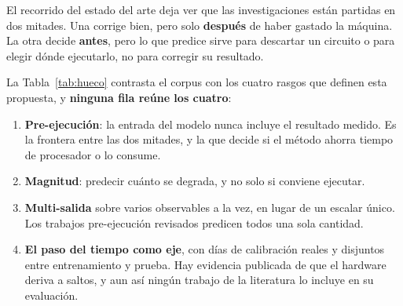 El recorrido del estado del arte deja ver que las investigaciones están partidas en dos mitades. Una
corrige bien, pero solo \textbf{después} de haber gastado la máquina. La otra decide
\textbf{antes}, pero lo que predice sirve para descartar un circuito o para elegir dónde
ejecutarlo, no para corregir su resultado.

La Tabla~\ref{tab:hueco} contrasta el corpus con los cuatro rasgos que definen esta propuesta, y
\textbf{ninguna fila reúne los cuatro}:

\begin{enumerate}
    \item \textbf{Pre-ejecución}: la entrada del modelo nunca incluye el resultado medido. Es la
          frontera entre las dos mitades, y la que decide si el método ahorra tiempo de
          procesador o lo consume.
    \item \textbf{Magnitud}: predecir cuánto se degrada, y no solo si conviene ejecutar.
    \item \textbf{Multi-salida} sobre varios observables a la vez, en lugar de un escalar único.
          Los trabajos pre-ejecución revisados predicen todos una sola cantidad.
    \item \textbf{El paso del tiempo como eje}, con días de calibración reales y disjuntos entre
          entrenamiento y prueba. Hay evidencia publicada de que el hardware deriva a saltos, y
          aun así ningún trabajo de la literatura lo incluye en su evaluación.
\end{enumerate}
